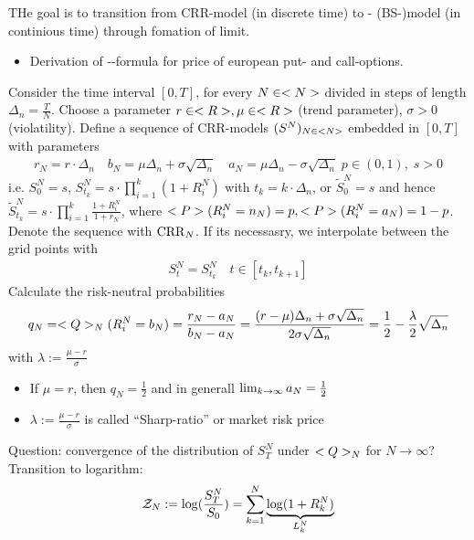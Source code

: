 THe goal is to transition from CRR-model (in discrete time) to - (BS-)model (in continious time) through fomation of limit.
\begin{itemize}
	\item Derivation of --formula for price of european put- and call-options. 
\end{itemize}
Consider the time interval $[0,T]$, for every $N \in \N$ divided in steps of length $\Delta_n = \frac{T}{N}$. Choose a parameter $r \in \R, \mu \in \R$ (trend parameter), $\sigma > 0$ (violatility). Define a sequence of CRR-models $(S^N)_{N \in \N}$ embedded in $[0,T]$ with parameters
\begin{align*}
	r_N = r \cdot \Delta_n \quad b_N = \mu \Delta_n + \sigma \sqrt{\Delta_n}\quad a_N = \mu \Delta_n - \sigma \sqrt{\Delta_n}\;p \in (0,1),\;s> 0
\end{align*}
i.e. $S^N_0 = s$, $S^N_{t_k} = s \cdot \prod_{i=1}^k (1+R_i^N)$ with $t_k = k \cdot \Delta_n$, or $\tilde{S}_0^N = s$ and hence $\tilde{S}^N_{t_k}= s \cdot \prod_{i=1}^k \frac{1+R_i^N}{1+r_N}$, where $\P(R^N_i = n_N) = p, \P(R^N_i = a_N) = 1-p$.
Denote the sequence with $\CRR_N$. If its necessasry, we interpolate between the grid points with
\begin{align*}
	S_t^N = S^N_{t_k} \quad t \in [t_k,t_{k+1}]
\end{align*}
Calculate the risk-neutral probabilities
\begin{align*}
	q_N = \QQ_N(R_i^N = b_N) = \frac{r_N - a_N}{b_N - a_N} = \frac{(r-\mu)\Delta_n + \sigma \sqrt{\Delta_n}}{2\sigma\sqrt{\Delta_n}} = \frac{1}{2} - \frac{\lambda}{2}\sqrt{\Delta_n}
\end{align*}
with $\lambda := \frac{\mu - r}{\sigma}$
\begin{*remark}
	\begin{itemize}
		\item If $\mu = r$, then $q_N = \frac{1}{2}$ and in generall $\lim_{k \to \infty}a_N = \half$
		\item $\lambda := \frac{\mu - r}{\sigma}$ is called ``Sharp-ratio'' or market risk price 
	\end{itemize}
\end{*remark}
Question: convergence of the distribution of $S^N_T$ under $\QQ_N$ for $N \to \infty$?\\
Transition to logarithm:
\begin{align*}
	\ZZ_N := \log(\frac{S^N_T}{S_0}) = \sum_{k=1}^N \underbrace{\log(1+R_k^N)}_{L^N_k}
\end{align*}
